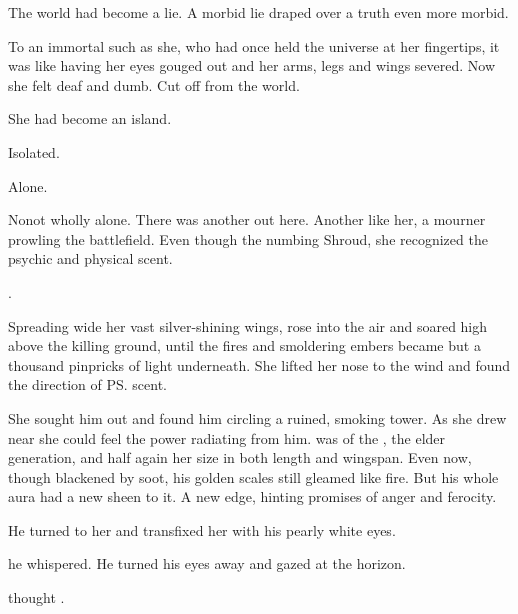 The world had become a lie. 
A morbid lie draped over a truth even more morbid. 

To an immortal such as she, who had once held the universe at her fingertips, it was like having her eyes gouged out and her arms, legs and wings severed. 
Now she felt deaf and dumb. 
Cut off from the world. 

She had become an island. 

Isolated. 

Alone. 

\begin{comment}
\section{\Secherdamon}
\end{comment}

No\prikker not wholly alone. 
There was another out here. 
Another like her, a mourner prowling the battlefield. 
Even though the numbing Shroud, she recognized the psychic and physical scent. 

. 

%     

Spreading wide her vast silver-shining wings, \Cryocas{} rose into the air and soared high above the killing ground, until the fires and smoldering embers became but a thousand pinpricks of light underneath. 
She lifted her nose to the wind and found the direction of \ps{\Secherdamon}{} scent. 

She sought him out and found him circling a ruined, smoking tower. 
As she drew near she could feel the power radiating from him. 
\Secherdamon{} was of the , the elder generation, and half again her size in both length and wingspan. 
Even now, though blackened by soot, his golden scales still gleamed like fire. 
But his whole aura had a new sheen to it. 
A new edge, hinting promises of anger and ferocity. 

He turned to her and transfixed her with his pearly white eyes. 

he whispered. 
He turned his eyes away and gazed at the horizon. 

 thought \Cryocas. 

